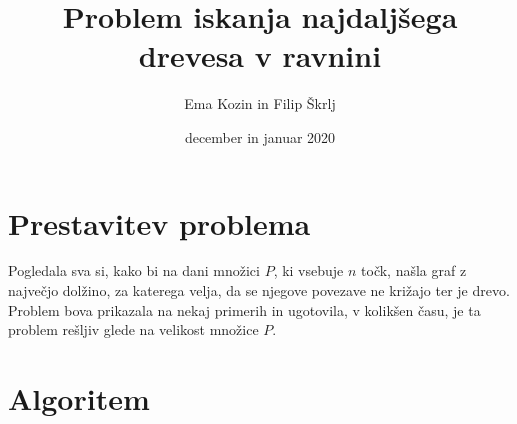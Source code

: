 \documentclass[a4paper,12pt]{article}
\title{Problem iskanja najdaljšega drevesa v ravnini}
\author{Ema Kozin in Filip Škrlj}
\date{december in januar 2020}
\begin{document}
	
\maketitle
	
\newpage
\section{Prestavitev problema}

Pogledala sva si, kako bi na dani množici $P$, ki vsebuje $n$ točk, našla graf z največjo dolžino, za katerega velja, da se njegove povezave ne križajo ter je drevo. Problem bova prikazala na nekaj primerih in ugotovila, v kolikšen času, je ta problem rešljiv glede na velikost množice $P$. 


\section{Algoritem}
\end{document}
